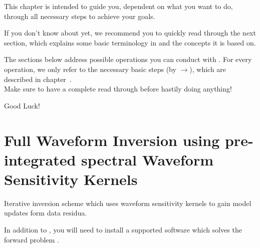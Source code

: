 
%
%
%
This chapter is intended to guide you, dependent on what you want to do, through all necessary steps
to achieve your goals.

If you don't know about \ASKI yet, we recommend you to quickly read through the next section, which 
explains some basic terminology in \ASKI and the concepts it is based on.

The sections below address possible operations you can conduct with \ASKI. For every operation, we only refer 
to the necessary basic steps (by $\rightarrow$), which are described in chapter~.\\
Make sure to have a complete read through before hastily doing anything!

Good Luck!
%
%
\newpage
\section*{Full Waveform Inversion using pre-integrated spectral Waveform Sensitivity Kernels} \label{guide,sec:classic_inversion}
%
%

Iterative inversion scheme which uses waveform sensitivity kernels to gain model updates form data residua.

In addition to \ASKI {}, you will need to install a supported software which 
solves the forward problem .
%
